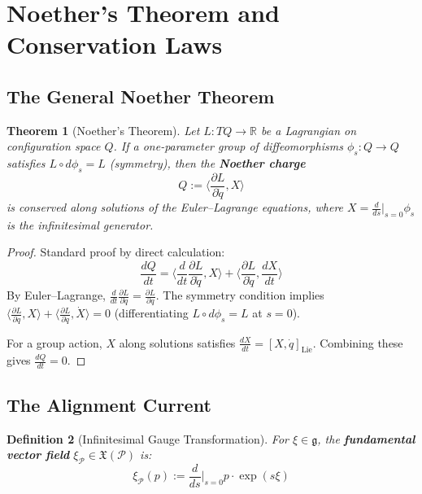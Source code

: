 \documentclass[11pt]{article}
\newtheorem{theorem}{Theorem}[section]
\newtheorem{definition}[theorem]{Definition}
\begin{document}
\section{Noether's Theorem and Conservation Laws}

\subsection{The General Noether Theorem}

\begin{theorem}[Noether's Theorem]
\label{thm:noether}
Let $L : TQ \to \mathbb{R}$ be a Lagrangian on configuration space
$Q$. If a one-parameter group of diffeomorphisms $\phi_s : Q \to Q$ satisfies $L \circ d\phi_s = L$ (symmetry),
then the \textbf{Noether charge}
\[
Q := \langle \frac{\partial L}{\partial \dot{q}}, X \rangle
\]
is conserved along solutions of the Euler--Lagrange equations, where $X = \frac{d}{ds}\big|_{s=0} \phi_s$ is the infinitesimal generator.
\end{theorem}

\begin{proof}
Standard proof by direct calculation:
\[
\frac{dQ}{dt} = \langle \frac{d}{dt}\frac{\partial L}{\partial \dot{q}}, X \rangle + \langle \frac{\partial L}{\partial \dot{q}}, \frac{dX}{dt} \rangle
\]
By Euler--Lagrange, $\frac{d}{dt}\frac{\partial L}{\partial \dot{q}} = \frac{\partial L}{\partial q}$. The symmetry condition implies $\langle \frac{\partial L}{\partial q}, X \rangle + \langle \frac{\partial L}{\partial \dot{q}}, \dot{X} \rangle = 0$
(differentiating $L \circ d\phi_s = L$ at $s = 0$).

For a group action, $X$ along solutions satisfies $\frac{dX}{dt} = [X, \dot{q}]_{\mathrm{Lie}}$. Combining these gives
$\frac{dQ}{dt} = 0$.
\end{proof}

\subsection{The Alignment Current}

\begin{definition}[Infinitesimal Gauge Transformation]
For $\xi \in \mathfrak{g}$, the \textbf{fundamental vector
field} $\xi_{\mathcal{P}} \in \mathfrak{X}(\mathcal{P})$ is:
\[
\xi_{\mathcal{P}}(p) := \frac{d}{ds}\bigg|_{s=0} p \cdot \exp(s\xi)
\]
\end{definition}
\end{document}
